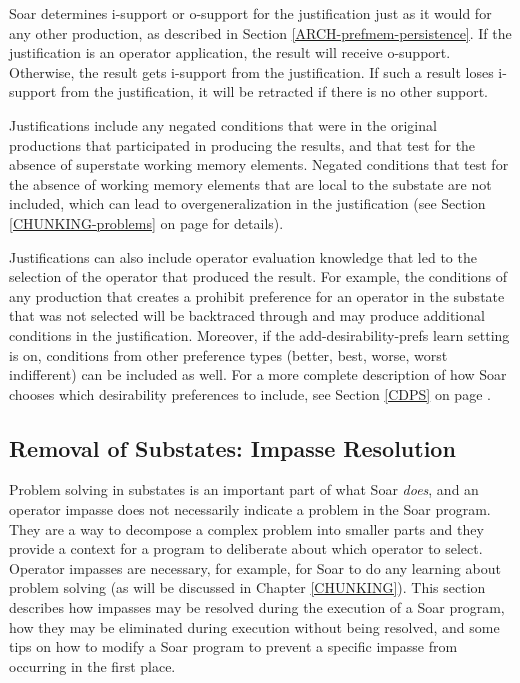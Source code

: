 Soar determines i-support or o-support for the justification just as it
would for any other production, as described in Section
\ref{ARCH-prefmem-persistence}.  If the justification is an operator
application, the result will receive o-support.  Otherwise, the result
gets i-support from the justification. If such a result loses
i-support from the justification, it will be retracted if there is no
other support.

Justifications include any negated conditions that were in the original
productions that participated in producing the results, and that test for the
absence of superstate working memory elements. Negated conditions that test for
the absence of working memory elements that are local to the substate are not
included, which can lead to overgeneralization in the justification (see Section
\ref{CHUNKING-problems} on page \pageref{CHUNKING-problems} for details).

Justifications can also include operator evaluation knowledge that led to the
selection of the operator that produced the result.  For example, the conditions
of any production that creates a prohibit preference for an operator in the substate that was not selected will be backtraced through
and may produce additional conditions in the justification.  Moreover, if the
add-desirability-prefs learn setting is on, conditions from other preference
types (better, best, worse, worst indifferent) can be included as well.  For a more
complete description of how Soar chooses which desirability preferences to
include, see Section \ref{CDPS} on page \pageref{CDPS}.

\subsection{Removal of Substates: Impasse Resolution}
\label{ARCH-impasses-elimination}

Problem solving in substates is an important part of what Soar
\textit{does}, and an operator impasse does not necessarily indicate a
problem in the Soar program.  They are a way to decompose a complex
problem into smaller parts and they provide a context for a program to
deliberate about which operator to select.  Operator impasses are necessary, for
example, for Soar to do any learning about problem solving (as will be
discussed in Chapter \ref{CHUNKING}). This section describes how
impasses may be resolved during the execution of a Soar program, how
they may be eliminated during execution without being resolved, and some
tips on how to modify a Soar program to prevent a specific impasse from
occurring in the first place.  

